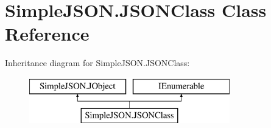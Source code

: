 \hypertarget{class_simple_j_s_o_n_1_1_j_s_o_n_class}{\section{Simple\+J\+S\+O\+N.\+J\+S\+O\+N\+Class Class Reference}
\label{class_simple_j_s_o_n_1_1_j_s_o_n_class}
}
Inheritance diagram for Simple\+J\+S\+O\+N.\+J\+S\+O\+N\+Class\+:\begin{figure}[H]
\begin{center}
\leavevmode
\includegraphics[height=2.000000cm]{class_simple_j_s_o_n_1_1_j_s_o_n_class}
\end{center}
\end{figure}
